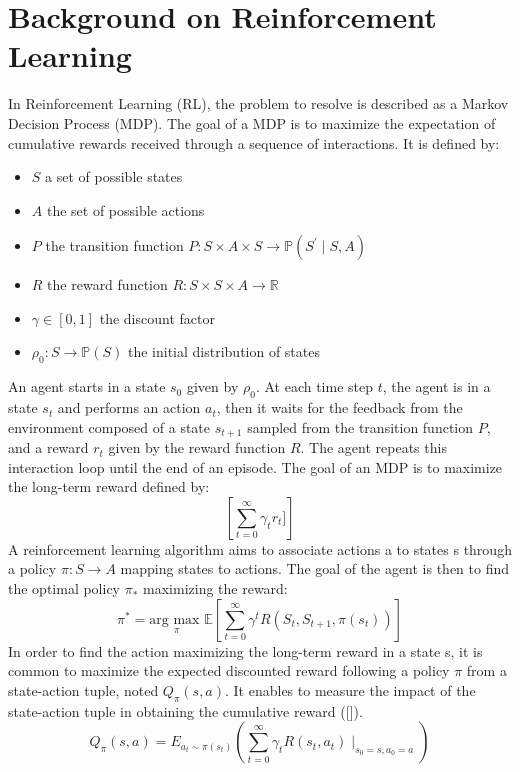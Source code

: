 \documentclass[conference]{IEEEtran}
\begin{document}
\section{Background on Reinforcement Learning} \label{sec:background}
In Reinforcement Learning (RL), the problem to resolve is described as a Markov Decision Process (MDP). The goal of a MDP is to maximize the expectation of cumulative rewards received through a sequence of interactions. It is defined by:
\begin{itemize}
\item $S$ a set of possible states
\item $A$ the set of possible actions
\item $P$ the transition function $P: S \times A \times S \to \mathbb{P}(S^{\prime}\mid{}S,A)$
\item $R$ the reward function $R: S \times S \times A \to \mathbb{R}$
\item $\gamma \in [0,1]$ the discount factor
\item $\rho_{0}: S \to \mathbb{P}(S)$ the initial distribution of states
\end{itemize}
An agent starts in a state $s_0$ given by $\rho_0$. At each time step $t$, the agent is in a state $s_t$ and performs an action $a_t$, then it waits for the feedback from the environment composed of a state $s_{t+1}$ sampled from the transition function $P$, and a reward $r_t$ given by the reward function $R$. The agent repeats this interaction loop until the end of an episode.
The goal of an MDP is to maximize the long-term reward defined by:
\begin{equation*}
    \left[\sum_{t=0}^{\infty} \gamma_{t}r_t]\right]
\end{equation*}
A reinforcement learning algorithm aims to associate actions a to states s through a policy $\pi: S \to A$ mapping states to actions. The goal of the agent is then to find the optimal policy $\pi_{\ast}$ maximizing the reward:
\begin{equation*}
    \pi^{\ast} = \underset{\pi}{\text{arg max }} \mathbb{E}\left[\sum_{t=0}^{\infty}\gamma^{t}R(S_t,S_{t+1},\pi(s_t))\right]
\end{equation*}
In order to find the action maximizing the long-term reward in a state s, it is common to maximize the expected discounted reward following a policy $\pi$ from a state-action tuple, noted $Q_{\pi}(s, a)$. It enables to measure the impact of the state-action tuple in obtaining the cumulative reward ([\cite{sutton2018reinforcement}]).
\begin{equation*}
    Q_{\pi}(s, a) = E_{a_{t}\sim\pi(s_t)}\left( \sum_{t=0}^{\infty}\gamma_{t}R(s_t,a_t)\mid_{s_0=s,a_0=a}\right)
\end{equation*}
\end{document}
